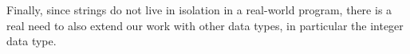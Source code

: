 
Finally, since strings do not live in isolation in
a real-world program, there is a real need to also extend our work with other
data types, in particular the integer data type.

